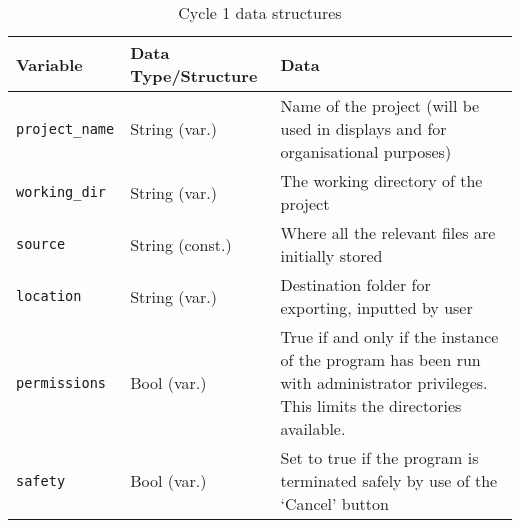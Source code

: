 \newpage
\begin{table}[!ht]
    \centering
    \begin{tabular}{@{}llp{}@{}} \toprule
        \textbf{Variable} & \textbf{Data Type/Structure} & \textbf{Data} \\ \midrule
        \verb|project_name| & String (var.) & Name of the project (will be used in displays and for organisational purposes) \\ \medskip
        \verb|working_dir| & String (var.) & The working directory of the project \\ \medskip
        \verb|source| & String (const.) & Where all the relevant files are initially stored \\ \medskip
        \verb|location| & String (var.) & Destination folder for exporting, inputted by user \\ \medskip
        \verb|permissions| & Bool (var.) & True if and only if the instance of the program has been run with administrator privileges. This limits the directories available. \\ \medskip
        \verb|safety| & Bool (var.) & Set to true if the program is terminated safely by use of the `Cancel' button \\
        \bottomrule
    \end{tabular}
    \caption{Cycle 1 data structures}
    \label{tbl:data_structs_c1}
\end{table}


